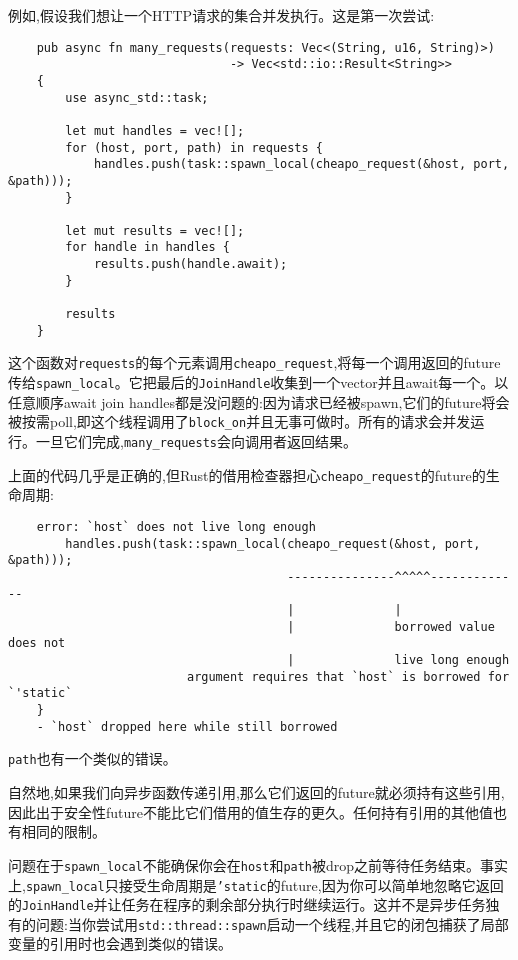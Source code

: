 例如,假设我们想让一个HTTP请求的集合并发执行。这是第一次尝试:
\begin{verbatim}
    pub async fn many_requests(requests: Vec<(String, u16, String)>)
                               -> Vec<std::io::Result<String>>
    {
        use async_std::task;

        let mut handles = vec![];
        for (host, port, path) in requests {
            handles.push(task::spawn_local(cheapo_request(&host, port, &path)));
        }

        let mut results = vec![];
        for handle in handles {
            results.push(handle.await);
        }

        results
    }
\end{verbatim}

这个函数对\texttt{requests}的每个元素调用\texttt{cheapo\_request},将每一个调用返回的future传给\texttt{spawn\_local}。它把最后的\texttt{JoinHandle}收集到一个vector并且await每一个。以任意顺序await join handles都是没问题的:因为请求已经被spawn,它们的future将会被按需poll,即这个线程调用了\texttt{block\_on}并且无事可做时。所有的请求会并发运行。一旦它们完成,\texttt{many\_requests}会向调用者返回结果。

上面的代码几乎是正确的,但Rust的借用检查器担心\texttt{cheapo\_request}的future的生命周期:
\begin{verbatim}
    error: `host` does not live long enough
        handles.push(task::spawn_local(cheapo_request(&host, port, &path)));
                                       ---------------^^^^^-------------
                                       |              |
                                       |              borrowed value does not
                                       |              live long enough
                         argument requires that `host` is borrowed for `'static`
    }
    - `host` dropped here while still borrowed
\end{verbatim}

\texttt{path}也有一个类似的错误。

自然地,如果我们向异步函数传递引用,那么它们返回的future就必须持有这些引用,因此出于安全性future不能比它们借用的值生存的更久。任何持有引用的其他值也有相同的限制。

问题在于\texttt{spawn\_local}不能确保你会在\texttt{host}和\texttt{path}被drop之前等待任务结束。事实上,\texttt{spawn\_local}只接受生命周期是\texttt{'static}的future,因为你可以简单地忽略它返回的\texttt{JoinHandle}并让任务在程序的剩余部分执行时继续运行。这并不是异步任务独有的问题:当你尝试用\texttt{std::thread::spawn}启动一个线程,并且它的闭包捕获了局部变量的引用时也会遇到类似的错误。

